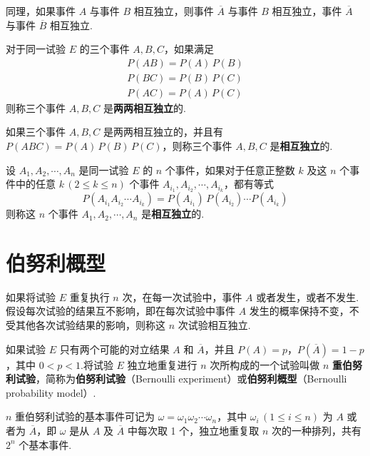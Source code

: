 同理，如果事件 $A$ 与事件 $B$ 相互独立，则事件 $\overline{A}$ 与事件 $B$ 相互独立，事件 $\overline{A}$ 与事件 $\overline{B}$ 相互独立.

\begin{definition} \label{def:independent-of-each-other-3}
    对于同一试验 $E$ 的三个事件 $A,B,C$，如果满足
    \begin{gather*}
        P(AB)=P(A)\,P(B)\\
        P(BC)=P(B)\,P(C)\\
        P(AC)=P(A)\,P(C)
    \end{gather*}
    则称三个事件 $A,B,C$ 是\textbf{两两相互独立}的.
\end{definition}

\begin{definition} \label{def:independent-3}
    如果三个事件 $A,B,C$ 是两两相互独立的，并且有 $P(ABC)=P(A)\,P(B)\,P(C)$，则称三个事件 $A,B,C$ 是\textbf{相互独立}的.
\end{definition}

\begin{definition} \label{def:independent-more}
    设 $A_1,A_2,\cdots,A_n$ 是同一试验 $E$ 的 $n$ 个事件，如果对于任意正整数 $k$ 及这 $n$ 个事件中的任意 $k\,(2\leqslant k\leqslant n)$ 个事件 $A_{i_1},A_{i_2},\cdots,A_{i_k}$，都有等式
    $$
    P(A_{i_1} A_{i_2} \cdots A_{i_k}) = P(A_{i_1}) \, P(A_{i_2}) \cdots P(A_{i_k})
    $$
    则称这 $n$ 个事件 $A_1,A_2,\cdots,A_n$ 是\textbf{相互独立}的.
\end{definition}

\section{伯努利概型}

如果将试验 $E$ 重复执行 $n$ 次，在每一次试验中，事件 $A$ 或者发生，或者不发生.假设每次试验的结果互不影响，即在每次试验中事件 $A$ 发生的概率保持不变，不受其他各次试验结果的影响，则称这 $n$ 次试验相互独立.

如果试验 $E$ 只有两个可能的对立结果 $A$ 和 $\overline{A}$，并且 $P(A)=p$，$P(\overline{A})=1-p$，其中 $0<p<1$.将试验 $E$ 独立地重复进行 $n$ 次所构成的一个试验叫做 $n$ \textbf{重伯努利试验}，简称为\textbf{伯努利试验}（Bernoulli experiment）或\textbf{伯努利概型}（Bernoulli probability model）.

$n$ 重伯努利试验的基本事件可记为 $\omega=\omega_1 \omega_2 \cdots \omega_n$，其中 $\omega_i\,(1\leqslant i\leqslant n)$ 为 $A$ 或者为 $\overline{A}$，即 $\omega$ 是从 $A$ 及 $\overline{A}$ 中每次取 1 个，独立地重复取 $n$ 次的一种排列，共有 $2^n$ 个基本事件.

